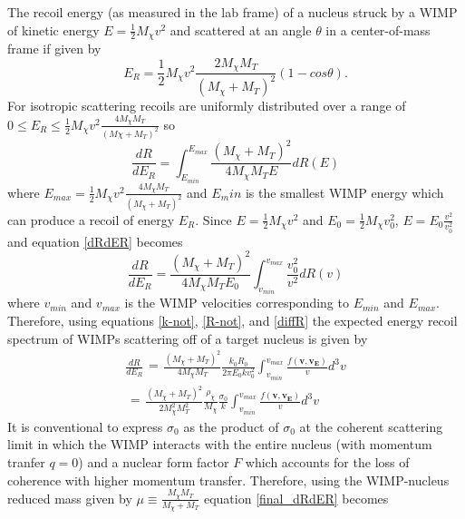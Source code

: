 \documentclass[a4paper,12pt]{article}
\begin{document}
The recoil energy (as measured in the lab frame) of a nucleus struck by a WIMP of kinetic energy $E=\frac{1}{2} M_\chi v^2$ and scattered at an angle $\theta$ in a center-of-mass frame if given by
\begin{equation}
E_R= \frac{1}{2} M_\chi v^2 \frac{2 M_\chi M_T}{(M_\chi + M_T)^2} (1-cos\theta).
\end{equation}
For isotropic scattering recoils are uniformly distributed over a range of $0 \leq E_R \leq \frac{1}{2} M_\chi v^2 \frac{4 M_\chi M_T}{(M\chi + M_T)^2}$ so
\begin{equation} \label{dRdER}
\frac{dR}{dE_R} = \int_{E_{min}}^{E_{max}} \frac{(M_\chi + M_T)^2}{4 M_\chi M_T E} dR(E)
\end{equation}
where $E_{max} = \frac{1}{2} M_\chi v^2 \frac{4 M_\chi M_T}{(M_\chi + M_T)^2}$ and $E_min$ is the smallest WIMP energy which can produce a recoil of energy $E_R$.  Since $E=\frac{1}{2}M_\chi v^2$ and $E_0=\frac{1}{2}M_\chi v_0^2$, $E=E_0 \frac{v^2}{v_0^2}$ and equation \ref{dRdER} becomes
\begin{equation}
\frac{dR}{dE_R} = \frac{(M_\chi + M_T)^2}{4 M_\chi M_T E_0} \int_{v_{min}}^{v_{max}} \frac{v_0^2}{v^2} dR(v)
\end{equation}
where $v_{min}$ and $v_{max}$ is the WIMP velocities corresponding to $E_{min}$ and $E_{max}$.
Therefore, using equations \ref{k-not}, \ref{R-not}, and \ref{diffR} the expected energy recoil spectrum of WIMPs scattering off of a target nucleus is given by
\begin{align} \label{final_dRdER}
\frac{dR}{dE_R} \begin{aligned} = \end{aligned} \frac{(M_\chi + M_T)^2}{4 M_\chi M_T} \frac{k_0 R_0}{2\pi E_0 k v_0^2}  \int_{v_{min}}^{v_{max}} \frac{f(\mathbf{v},\mathbf{v_E})}{v} d^3v \nonumber \\
\begin{aligned} = \end{aligned} \frac{ (M_\chi + M_T)^2}{2M_\chi^2M_T^2} \frac{\rho_\chi}{M_\chi} \frac{\sigma_0}{k} \int_{v_{min}}^{v_{max}} \frac{f(\mathbf{v},\mathbf{v_E})}{v} d^3v
\end{align}
It is conventional to express $\sigma_0$ as the product of $\sigma_0$ at the coherent scattering limit in which the WIMP interacts with the entire nucleus (with momentum tranfer $q=0$) and a nuclear form factor $F$ which accounts for the loss of coherence with higher momentum transfer.  Therefore, using the WIMP-nucleus reduced mass given by $\mu\equiv \frac{M_\chi M_T}{M_\chi + M_T}$ equation \ref{final_dRdER} becomes
\end{document}
